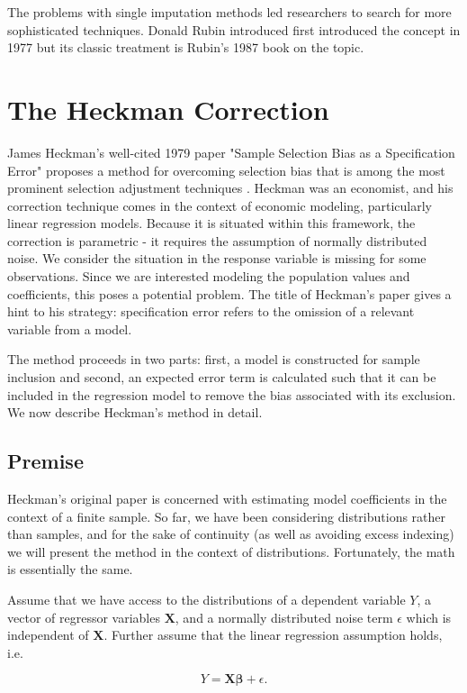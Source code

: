 \documentclass[12pt,twoside]{reedthesis}
\theoremstyle{definition}
\begin{document}
The problems with single imputation methods led researchers to search for more sophisticated techniques. Donald Rubin introduced first introduced the concept in 1977 \citep{Rubin_1977}but its classic treatment is Rubin's 1987 book on the topic. 

\section{The Heckman Correction}
James Heckman's well-cited 1979 paper "Sample Selection Bias as a Specification Error" proposes a method for overcoming selection bias that is among the most prominent selection adjustment techniques \citep{Heckman_1979}. Heckman was an economist, and his correction technique comes in the context of economic modeling, particularly linear regression models. Because it is situated within this framework, the correction is parametric - it requires the  assumption of normally distributed noise. We consider the situation in the response variable is missing for some observations. Since we are interested modeling the population values and coefficients, this poses a potential problem. The title of Heckman's paper gives a hint to his strategy: specification error refers to the omission of a relevant variable from a model. 

The method proceeds in two parts: first, a model is constructed for sample inclusion and second, an expected error term is calculated such that it can be included in the regression model to remove the bias associated with its exclusion. We now describe Heckman's method in detail.

\subsection{Premise}

Heckman's original paper is concerned with estimating model coefficients in the context of a finite sample. So far, we have been considering distributions rather than samples, and for the sake of continuity (as well as avoiding excess indexing) we will present the method in the context of distributions. Fortunately, the math is essentially the same.

Assume that we have access to the distributions of a dependent variable $Y$, a vector of regressor variables $\mathbf{X}$, and a normally distributed noise term $\epsilon$ which is independent of $\mathbf{X}$. Further assume that the linear regression assumption holds, i.e.

$$Y = \mathbf{X} \boldsymbol{\beta} + \epsilon.$$
\end{document}
